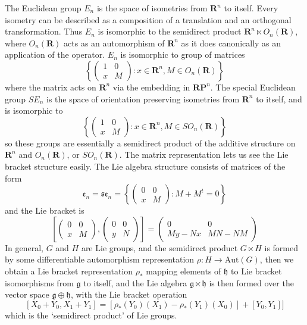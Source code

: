 \begin{example}
    The Euclidean group $E_n$ is the space of isometries from $\mathbf{R}^n$ to itself. Every isometry can be described as a composition of a translation and an orthogonal transformation. Thus $E_n$ is isomorphic to the semidirect product $\mathbf{R}^n \ltimes O_n(\mathbf{R})$, where $O_n(\mathbf{R})$ acts as an automorphism of $\mathbf{R}^n$ as it does canonically as an application of the operator. $E_n$ is isomorphic to group of matrices
    \[ \left\{ \begin{pmatrix} 1 & 0 \\ x & M \end{pmatrix} : x \in \mathbf{R}^n , M \in O_n(\mathbf{R}) \right\} \]
    where the matrix acts on $\mathbf{R}^n$ via the embedding in $\mathbf{RP}^n$. The special Euclidean group $SE_n$ is the space of orientation preserving isometries from $\mathbf{R}^n$ to itself, and is isomorphic to
    \[ \left\{ \begin{pmatrix} 1 & 0 \\ x & M \end{pmatrix} : x \in \mathbf{R}^n, M \in SO_n(\mathbf{R}) \right\} \]
    so these groups are essentially a semidirect product of the additive structure on $\mathbf{R}^n$ and $O_n(\mathbf{R})$, or $SO_n(\mathbf{R})$. The matrix representation lets us see the Lie bracket structure easily. The Lie algebra structure consists of matrices of the form
    \[ \mathfrak{e}_n =\mathfrak{se}_n = \left\{ \begin{pmatrix} 0 & 0 \\ x & M \end{pmatrix} : M + M^t = 0 \right\} \]
    and the Lie bracket is
    \[ \left[ \begin{pmatrix} 0 & 0 \\ x & M \end{pmatrix}, \begin{pmatrix} 0 & 0 \\ y & N \end{pmatrix} \right] = \begin{pmatrix} 0 & 0 \\ My - Nx & MN - NM \end{pmatrix} \]
    In general, $G$ and $H$ are Lie groups, and the semidirect product $G \ltimes H$ is formed by some differentiable automorphism representation $\rho:H \to \text{Aut}(G)$, then we obtain a Lie bracket representation $\rho_*$ mapping elements of $\mathfrak{h}$ to Lie bracket isomorphisms from $\mathfrak{g}$ to itself, and the Lie algebra $\mathfrak{g} \ltimes \mathfrak{h}$ is then formed over the vector space $\mathfrak{g} \oplus \mathfrak{h}$, with the Lie bracket operation
    \[ [X_0 + Y_0, X_1 + Y_1] = [\rho_*(Y_0)(X_1) - \rho_*(Y_1)(X_0)] + [Y_0,Y_1]] \]
    which is the `semidirect product' of Lie groups.
\end{example}

